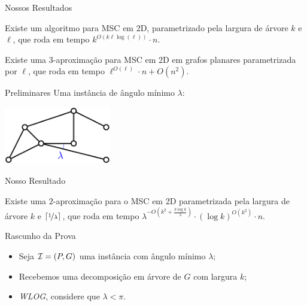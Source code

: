 \begin{frame}{Nossos Resultados}
  \begin{thm}
    Existe um algoritmo \FPT para MSC em 2D, parametrizado pela largura de árvore $k$ e $\ell$, que roda em tempo $k^{O(k \ell \log(\ell))} \cdot n$.
  \end{thm}

  \pause
  \begin{cor}
    Existe uma $3$-aproximação para MSC em 2D em grafos planares parametrizada por $\ell$, que roda em tempo $\ell^{O(\ell)} \cdot n + O(n^2)$.
  \end{cor}
\end{frame}

\begin{frame}{Preliminares}
  \centering
  Uma instância de ângulo mínimo $\lambda$:

  \bigskip
  \begin{minipage}{\linewidth}
    \centering
    \includegraphics[height=2.5cm]{MSC/lambda.png}
  \end{minipage}
\end{frame}

\begin{frame}{Nosso Resultado}
  \begin{thm}
    Existe uma $2$-aproximação para o MSC em 2D parametrizada pela largura de árvore $k$ e $\lceil \nicefrac{1}{\lambda} \rceil$, que roda em tempo $\lambda^{-O(k^2 + \frac{k \log k}{\lambda})} \cdot (\log k)^{O(k^2)} \cdot n$.
  \end{thm}
\end{frame}

\begin{frame}{Rascunho da Prova}
    \begin{itemize}[<+->]
        \item Seja $\mathcal{I} = (P, G)$ uma instância com ângulo mínimo $\lambda$;

        \item Recebemos uma decomposição em árvore de $G$ com largura $k$;

        \item \emph{WLOG}, considere que $\lambda < \pi$.
    \end{itemize}
\end{frame}

